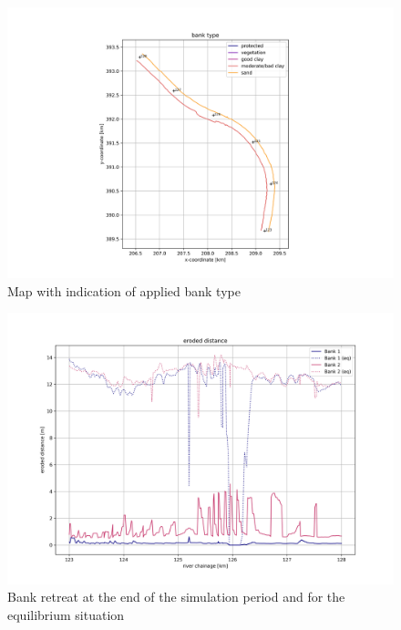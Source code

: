 \begin{figure}
\includegraphics[width=\textwidth]{figures/10_banktype.png}
\caption{Map with indication of applied bank type}
\label{Fig2.12}
\end{figure}

\begin{figure}
\includegraphics[width=\textwidth]{figures/11_erodis.png}
\caption{Bank retreat at the end of the simulation period and for the equilibrium situation}
\label{Fig2.13}
\end{figure}


